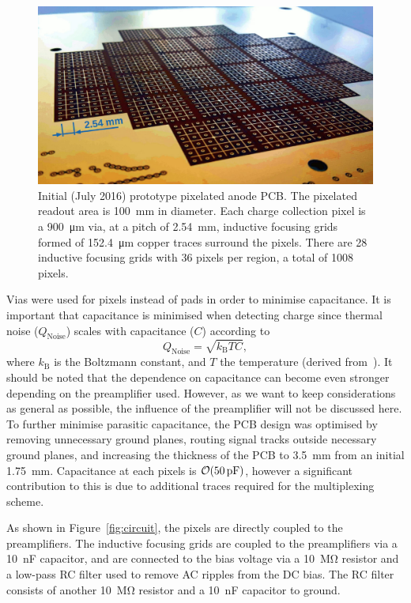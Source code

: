 \documentclass[instruments,article,submit,moreauthors,pdftex]{Definitions/mdpi}
\begin{document}
\begin{figure}[!ht]
	\centering
	\includegraphics[width=0.65\linewidth]{Figures/pixies.jpg}
	\caption{Initial (July 2016) prototype pixelated anode PCB. The pixelated readout area is \SI{100}{\milli\metre} in diameter.
		Each charge collection pixel is a \SI{900}{\micro\metre} via, at a pitch of \SI{2.54}{\milli\metre}, inductive focusing grids formed of \SI{152.4}{\micro\metre} copper traces surround the pixels. There are 28 inductive focusing grids with 36 pixels per region, a total of 1008 pixels.}
	\label{fig:pixies}
\end{figure}

Vias were used for pixels instead of pads in order to minimise capacitance.
It is important that capacitance is minimised when detecting charge since thermal noise ($Q_{\mathrm{Noise}}$) scales with capacitance ($C$) according to
\begin{equation}
	Q_{\mathrm{Noise}} = \sqrt{k_{\mathrm{B}}TC} \mathrm{,}
\end{equation}
where $k_{\mathrm{B}}$ is the Boltzmann constant, and $T$ the temperature (derived from~\cite{noise}).
It should be noted that the dependence on capacitance can become even stronger depending on the preamplifier used.
However, as we want to keep considerations as general as possible, the influence of the preamplifier will not be discussed here.
To further minimise parasitic capacitance, the PCB design was optimised by removing unnecessary ground planes, routing signal tracks outside necessary ground planes, and increasing the thickness of the PCB to \SI{3.5}{\milli\metre} from an initial \SI{1.75}{\milli\metre}. 
Capacitance at each pixels is $\order{\SI{50}{\pico\farad}}$, however a significant contribution to this is due to additional traces required for the multiplexing scheme.

As shown in Figure~\ref{fig:circuit}, the pixels are directly coupled to the preamplifiers.
The inductive focusing grids are coupled to the preamplifiers via a \SI{10}{\nano\farad} capacitor, and are connected to the bias voltage via a \SI{10}{\mega\ohm} resistor and a low-pass RC filter used to remove AC ripples from the DC bias. 
The RC filter consists of another \SI{10}{\mega\ohm} resistor and a \SI{10}{\nano\farad} capacitor to ground.   
\end{document}
